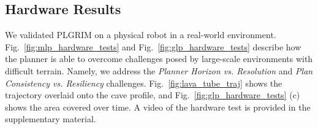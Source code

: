 \documentclass[letterpaper]{article} %
\begin{document}
\subsection{Hardware Results}
We validated PLGRIM on a physical robot in a real-world environment. Fig.~\ref{fig:mlp_hardware_tests} and Fig.~\ref{fig:glp_hardware_tests} describe how the planner is able to overcome challenges posed by large-scale environments with difficult terrain. Namely, we address the \textit{Planner Horizon vs. Resolution} and \textit{Plan Consistency vs. Resiliency} challenges. Fig.~\ref{fig:lava_tube_traj} shows the trajectory overlaid onto the cave profile, and Fig.~\ref{fig:glp_hardware_tests} (c) shows the area covered over time. A video of the hardware test is provided in the supplementary material.


	    
	    
	    	
\end{document}
